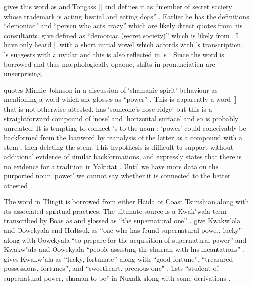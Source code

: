 \citeauthor{leer:1978b} gives this word as  and Tongass  [] and defines it as “member of secret society whose trademark is acting bestial and eating dogs” \parencite[16]{leer:1978b}.
Earlier he has the definitions “demoniac” and “person who acts crazy” \parencite[04/33]{leer:1973} which are likely direct quotes from his consultants.
\citeauthor{naish-story:1976} give  defined as “demoniac (secret society)” \parencite[93]{naish-story:1976} which is likely from \citeauthor{leer:1973}.
I have only heard  [] with a short initial vowel which accords with \citeauthor{swanton:1909}’s transcription.
\citeauthor{swanton:1909}’s  suggests  with a uvular and this is also reflected in \citeauthor{mcclellan:1975b}’s  \parencite[567]{mcclellan:1975b}.
Since the word is borrowed and thus morphologically opaque, shifts in pronunciation are unsurprising.

\citeauthor{de-laguna:1972} quotes  Minnie Johnson in a discussion of  ‘shamanic spirit’ behaviour as mentioning a word  which she glosses as “power” \parencite[704 col.\ 1 para.\ 2]{de-laguna:1972}.
This is apparently a word  [] that is not otherwise attested.
\citeauthor{leer:1973} has  ‘someone’s nose-ridge’ \parencite[f06/5]{leer:1973} but this is a straightforward compound of  ‘nose’ and  ‘horizontal surface’ and so is probably unrelated.
It is tempting to connect \citeauthor{de-laguna:1972}’s  to the noun :  ‘power’ could conceivably be backformed from the loanword  by reanalysis of the latter as a compound  with a stem , then deleting the stem.
This hypothesis is difficult to support without additional evidence of similar backformations, and \citeauthor{de-laguna:1972} expressly states that there is no evidence for a  tradition in Yakutat \parencite[628]{de-laguna:1972}.
Until we have more data on the purported noun  ‘power’ we cannot say whether it is connected to the better attested .

The word  in Tlingit is borrowed from either Haida or Coast Tsimshian along with its associated spiritual practices.
The ultimate source is a Kwakʼwala term transcribed by Boas as  and glossed as “the supernatural one” \parencite[693 line 1]{boas-hunt:1897}.
\citeauthor{lincoln-rath:1980} give Kwakwʼala and Oowekyala  and Heiltsuk  as “one who has found supernatural power, lucky” along with Oowekyala  “to prepare for the acquisition of supernatural power” and Kwakwʼala and Oowekyala  “people assisting the shaman with his incantations” \parencite[180]{lincoln-rath:1980}. \citeauthor{grubb:1977} gives Kwakwʼala  as “lucky, fortunate” along with  “good fortune”,  “treasured possessions, fortunes”, and  “sweetheart, precious one” \parencite[165]{grubb:1977}.
\citeauthor{nater:1990} lists  “student of supernatural power, shaman-to-be” in Nuxalk along with some derivations \parencite[64]{nater:1990}.

